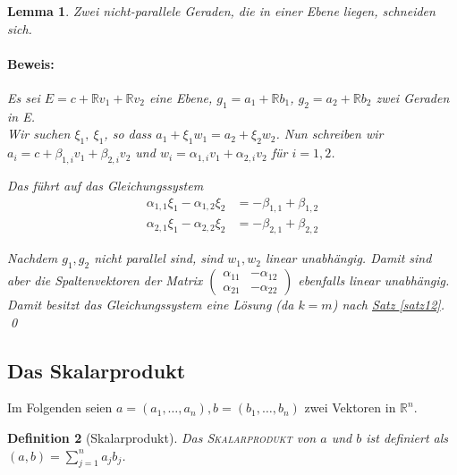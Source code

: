 \documentclass{report}
\newcommand{\IN}[1]{\index{#1|BH}}
\newcommand{\R}{\mathbb{R}}
\newcommand{\mRn}{\(\mathbb{R}^n\)}
\newcommand{\al}{\alpha}
\theoremstyle{customrem}
\theoremstyle{customdef}
\newtheorem{definition}{Definition}[chapter]
\newtheorem{lemma}[definition]{Lemma}
\renewenvironment{proof}{\paragraph{Beweis: }}{\qed}
\theoremstyle{customenv}
\newcommand{\defemph}[1]{\textsc{#1}}
\begin{document}
	\begin{lemma}
		Zwei nicht-parallele Geraden, die in einer Ebene liegen, schneiden sich.
		\begin{proof}
			Es sei \(E = c + \R v_1 + \R v_2\) eine Ebene, \(g_1 = a_1 + \R b_1\), \(g_2 = a_2 + \R b_2\) zwei Geraden in E.\\
			Wir suchen \(\xi_1,\ \xi_1\), so dass \(a_1 + \xi_1 w_1 = a_2 + \xi_2 w_2\). Nun schreiben wir \(a_i = c + \beta_{1,i} v_1 + \beta_{2,i} v_2\) und \(w_i = \al_{1,i} v_1 + \al_{2,i} v_2\) für \(i =1,2\).
			
			Das führt auf das Gleichungssystem
			\begin{align*}
				\al_{1,1} \xi_1 - \al_{1,2} \xi_2	&= - \beta_{1,1} + \beta_{1,2}\\
				\al_{2,1} \xi_1 - \al_{2,2} \xi_2 	&= - \beta_{2,1} + \beta_{2,2}
			\end{align*}
			
			Nachdem \(g_1, g_2\) nicht parallel sind, sind \(w_1, w_2\) linear unabhängig. Damit sind aber die Spaltenvektoren der Matrix \(\left(
			\begin{smallmatrix}
			\al_{11} & -\al_{12}\\
			\al_{21} & -\al_{22}
			\end{smallmatrix}\right)
			\) ebenfalls linear unabhängig. Damit besitzt das Gleichungssystem eine Lösung (da \(k = m\)) nach \hyperref[satz12]{Satz \ref*{satz12}}.
		\end{proof}
	\end{lemma}
	\vspace{.4cm}
	\subsection{Das Skalarprodukt}
	Im Folgenden seien \(a = (a_1, \dots, a_n), b = (b_1, \dots, b_n)\) zwei Vektoren in \mRn.
	
	\begin{definition}[Skalarprodukt]
		\IN{Skalarprodukt}
		Das \defemph{Skalarprodukt} von \(a\) und \(b\) ist definiert als \((a, b) = \sum_{j=1}^n a_j b_j\).
	\end{definition}
	
\end{document}
